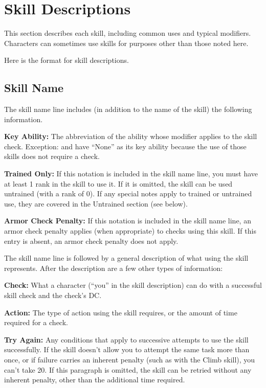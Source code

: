 \section{Skill Descriptions}
This section describes each skill, including common uses and typical modifiers. Characters can sometimes use skills for purposes other than those noted here.

Here is the format for skill descriptions.

\subsection{Skill Name}
The skill name line includes (in addition to the name of the skill) the following information.

\textbf{Key Ability:} The abbreviation of the ability whose modifier applies to the skill check. Exception:  and  have ``None'' as its key ability because the use of those skills does not require a check.

\textbf{Trained Only:} If this notation is included in the skill name line, you must have at least 1 rank in the skill to use it. If it is omitted, the skill can be used untrained (with a rank of 0). If any special notes apply to trained or untrained use, they are covered in the Untrained section (see below).

\textbf{Armor Check Penalty:} If this notation is included in the skill name line, an armor check penalty applies (when appropriate) to checks using this skill. If this entry is absent, an armor check penalty does not apply.

The skill name line is followed by a general description of what using the skill represents. After the description are a few other types of information:

\textbf{Check:} What a character (``you'' in the skill description) can do with a successful skill check and the check's DC.

\textbf{Action:} The type of action using the skill requires, or the amount of time required for a check.

\textbf{Try Again:} Any conditions that apply to successive attempts to use the skill successfully. If the skill doesn't allow you to attempt the same task more than once, or if failure carries an inherent penalty (such as with the Climb skill), you can't take 20. If this paragraph is omitted, the skill can be retried without any inherent penalty, other than the additional time required.


